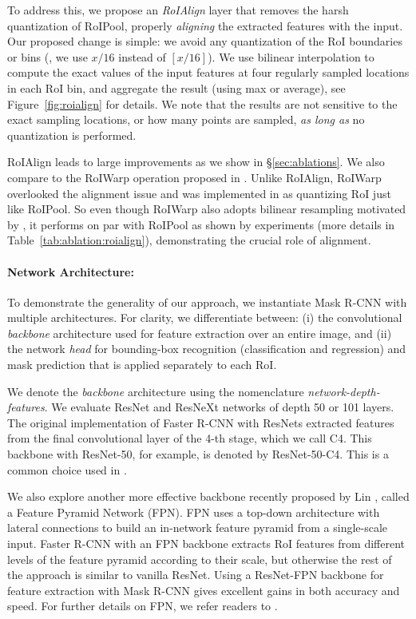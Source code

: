 \documentclass[10pt,twocolumn,letterpaper]{article}
\begin{document}
To address this, we propose an \emph{RoIAlign} layer that removes the harsh quantization of RoIPool, properly \emph{aligning} the extracted features with the input. Our proposed change is simple: we avoid any quantization of the RoI boundaries or bins (\ie, we use $x/16$ instead of $[x/16]$). We use bilinear interpolation \cite{Jaderberg2015} to compute the exact values of the input features at four regularly sampled locations in each RoI bin, and aggregate the result (using max or average), see Figure~\ref{fig:roialign} for details. We note that the results are not sensitive to the exact sampling locations, or how many points are sampled, \emph{as long as} no quantization is performed.

RoIAlign leads to large improvements as we show in \S\ref{sec:ablations}. We also compare to the RoIWarp operation proposed in \cite{Dai2016}.
Unlike RoIAlign, RoIWarp overlooked the alignment issue and was implemented in \cite{Dai2016} as quantizing RoI just like RoIPool. So even though RoIWarp also adopts bilinear resampling motivated by \cite{Jaderberg2015}, it performs on par with RoIPool as shown by experiments (more details in Table~\ref{tab:ablation:roialign}), demonstrating the crucial role of alignment.

\paragraph{Network Architecture:} To demonstrate the generality of our approach, we instantiate Mask R-CNN with multiple architectures. For clarity, we differentiate between: (i) the convolutional \emph{backbone} architecture used for feature extraction over an entire image, and (ii) the network \emph{head} for bounding-box recognition (classification and regression) and mask prediction that is applied separately to each RoI.

We denote the \emph{backbone} architecture using the nomenclature \emph{network-depth-features}. We evaluate ResNet \cite{He2016} and ResNeXt \cite{Xie2017} networks of depth 50 or 101 layers. The original implementation of Faster R-CNN with ResNets \cite{He2016} extracted features from the final convolutional layer of the 4-th stage, which we call C4. This backbone with ResNet-50, for example, is denoted by ResNet-50-C4. This is a common choice used in \cite{He2016,Dai2016,Huang2017,Shrivastava2016a}.

We also explore another more effective backbone recently proposed by Lin \etal \cite{Lin2017}, called a Feature Pyramid Network (FPN). FPN uses a top-down architecture with lateral connections to build an in-network feature pyramid from a single-scale input. Faster R-CNN with an FPN backbone extracts RoI features from different levels of the feature pyramid according to their scale, but otherwise the rest of the approach is similar to vanilla ResNet. Using a ResNet-FPN backbone for feature extraction with Mask R-CNN gives excellent gains in both accuracy and speed. For further details on FPN, we refer readers to \cite{Lin2017}.
\end{document}
